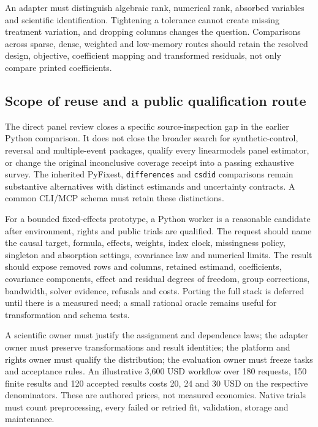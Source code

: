An adapter must distinguish algebraic rank, numerical rank, absorbed
variables and scientific identification. Tightening a tolerance cannot
create missing treatment variation, and dropping columns changes the
question. Comparisons across sparse, dense, weighted and low-memory routes
should retain the resolved design, objective, coefficient mapping and
transformed residuals, not only compare printed coefficients.
\citep{exec24_lmpanel_reference}

\subsection{Scope of reuse and a public qualification route}
The direct panel review closes a specific source-inspection gap in the
earlier Python comparison. It does not close the broader search for
synthetic-control, reversal and multiple-event packages, qualify every
linearmodels panel estimator, or change the original inconclusive coverage
receipt into a passing exhaustive survey. The inherited PyFixest,
\texttt{differences} and \texttt{csdid} comparisons remain substantive
alternatives with distinct estimands and uncertainty contracts. A common
CLI/MCP schema must retain these distinctions.
\citep{exec24_lmpanel_reference}

For a bounded fixed-effects prototype, a Python worker is a reasonable
candidate after environment, rights and public trials are qualified.
The request should name the causal target, formula, effects, weights,
index clock, missingness policy, singleton and absorption settings,
covariance law and numerical limits. The result should expose removed rows
and columns, retained estimand, coefficients, covariance components,
effect and residual degrees of freedom, group corrections, bandwidth,
solver evidence, refusals and costs. Porting the full stack is deferred
until there is a measured need; a small rational oracle remains useful
for transformation and schema tests.~\citep{exec24_lmpanel_reference}

A scientific owner must justify the assignment and dependence laws; the
adapter owner must preserve transformations and result identities; the
platform and rights owner must qualify the distribution; the evaluation
owner must freeze tasks and acceptance rules. An illustrative 3,600 USD
workflow over 180 requests, 150 finite results and 120 accepted results
costs 20, 24 and 30 USD on the respective denominators. These are authored
prices, not measured economics. Native trials must count preprocessing,
every failed or retried fit, validation, storage and maintenance.
\citep{exec24_lmpanel_reference}

